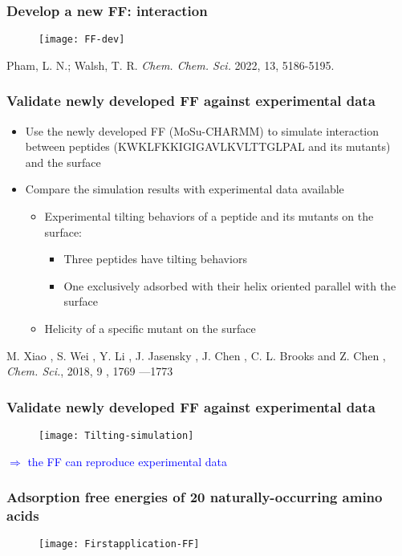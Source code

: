 \documentclass[xcolor=table,aspectratio=169]{beamer}
\begin{document}
\begin{frame}
	\frametitle{Develop a new FF:  interaction}
	\begin{figure}
		\texttt{[image: FF-dev]}
	\end{figure}
	\tiny{Pham, L. N.; Walsh, T. R. \emph{Chem. Chem. Sci.} 2022, 13, 5186-5195.}
\end{frame}

\begin{frame}
	\frametitle{Validate newly developed FF against experimental data}
	\begin{itemize}
		\item Use the newly developed FF (MoSu-CHARMM) to simulate interaction between peptides (KWKLFKKIGIGAVLKVLTTGLPAL and its mutants) and the  surface
		\item Compare the simulation results with experimental data available
		      \begin{itemize}
			      \item Experimental tilting behaviors of a peptide and its mutants on the  surface:
			            \begin{itemize}
				            \item Three peptides have tilting behaviors
				            \item One exclusively adsorbed with their helix oriented parallel with the surface
			            \end{itemize}
			      \item Helicity of a specific mutant on the  surface
		      \end{itemize}
	\end{itemize}
\tiny{M. Xiao , S. Wei , Y. Li , J. Jasensky , J. Chen , C. L. Brooks and Z. Chen , \emph{Chem. Sci.}, 2018, 9 , 1769 —1773}
\end{frame}


\begin{frame}
	\frametitle{Validate newly developed FF against experimental data}
	\begin{figure}
		\texttt{[image: Tilting-simulation]}
	\end{figure}
	\textcolor{blue}{$\Rightarrow$ the FF can reproduce experimental data}
\end{frame}


\begin{frame}
	\frametitle{Adsorption free energies of 20 naturally-occurring amino acids}
	\begin{figure}
		\texttt{[image: Firstapplication-FF]}
	\end{figure}
\end{frame}
\end{document}
